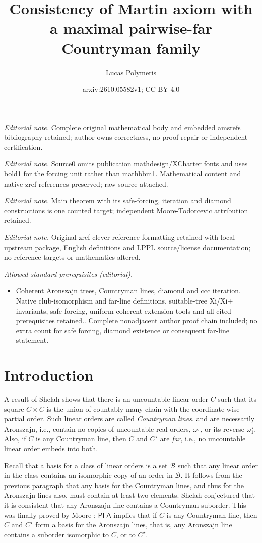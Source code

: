 \documentclass[10pt,a4paper]{amsart}
\title{Consistency of Martin axiom with a maximal pairwise-far Countryman family}
\author{Lucas Polymeris}
\date{arxiv:2610.05582v1; CC BY 4.0}
\theoremstyle{definition}
\newcommand{\PFA}{\textsf{PFA}}
\newcommand{\1}{\mathbf{1}}
\begin{document}
\maketitle
\noindent\textit{Editorial note.} Complete original mathematical body and embedded amsrefs bibliography retained; author owns correctness, no proof repair or independent certification.\par\medskip
\noindent\textit{Editorial note.} Source0 omits publication mathdesign/XCharter fonts and uses bold1 for the forcing unit rather than mathbbm1. Mathematical content and native zref references preserved; raw source attached.\par\medskip
\noindent\textit{Editorial note.} Main theorem with its safe-forcing, iteration and diamond constructions is one counted target; independent Moore-Todorcevic attribution retained.\par\medskip
\noindent\textit{Editorial note.} Original zref-clever reference formatting retained with local upstream package, English definitions and LPPL source/license documentation; no reference targets or mathematics altered.\par\medskip
\noindent\textit{Allowed standard prerequisites (editorial).}\begin{itemize}
\item Coherent Aronszajn trees, Countryman lines, diamond and ccc iteration. Native club-isomorphism and far-line definitions, suitable-tree Xi/Xi+ invariants, safe forcing, uniform coherent extension tools and all cited prerequisites retained.. Complete nonadjacent author proof chain included; no extra count for safe forcing, diamond existence or consequent far-line statement.
\end{itemize}\medskip
\section{Introduction}

A result of Shelah \cite{Shelah1976} shows that there is an
uncountable linear order $C$ such that its square $C \times C$ is the
union of countably many chain with the coordinate-wise partial order.
Such linear orders are called \emph{Countryman lines}, and are
necessarily Aronszajn, i.e., contain no copies of uncountable real
orders, $\omega_{1}$, or its reverse $\omega_{1}^{\star}$. Also, if
$C$ is any Countryman line, then $C$ and $C^{\star}$ are
\emph{far}, i.e., no uncountable linear order embeds into both.

Recall that a basis for a class of linear orders is a set
$\mathcal{B}$ such that any linear order in the class contains an
isomorphic copy of an order in $\mathcal{B}$. It follows from
the previous paragraph that any basis
for the Countryman lines, and thus for the Aronszajn lines also, must
contain at least two elements. Shelah \cite{Shelah1976} conjectured
that it is consistent that any Aronszajn line contains a Countryman
suborder. This was finally proved by Moore \cite{5-basis}; $\PFA$
implies that if $C$ is any Countryman line, then $C$ and $C^{\star}$ form
a basis for the Aronszajn lines, that is, any Aronszajn line contains
a suborder isomorphic to $C$, or to $C^{\star}$.
\end{document}
